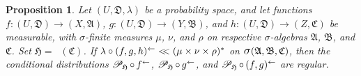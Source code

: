 \documentclass[
twoside=true,
paper=letter,
fontsize=9pt,
pagesize=auto,
leqno,
openany,
headsepline,
overfullrule,
]{scrbook}
\theoremstyle{plain}
\theoremstyle{plain}
\newtheorem{prop}[thm]{Proposition}
\theoremstyle{definition}
\theoremstyle{bfnoteitalic}
\theoremstyle{bfnoteroman}
\newcommand{\sigalg}[1]{\mathfrak{#1}}
\newcommand{\cali}[1]{\mathscr{#1}}
\newcommand{\condprobop}[1]{\mathop{\cali{P}\hspace{-1pt}}\nolimits_{#1}}
\newcommand{\sagb}{\mathop{\hbox{\large{$\sigma$}}}\nolimits}
\newcommand{\textsigma}{\hbox{\large{$\sigma$}}\kern-1pt}
\newcommand{\preimage}[1]{\mathop{#1^{\leftarrow}}}
\newcommand{\sigmaalgebra}{\sigalg{A}}
\newcommand{\sigmaalgebraii}{\sigalg{B}}
\newcommand{\sigmaalgebraiii}{\sigalg{C}}
\newcommand{\productsig}[2]{\sagb(#1,#2)}
\newcommand{\funcf}{f}
\newcommand{\funcg}{g}
\newcommand{\funch}{h}
\newcommand{\function}{f}
\newcommand{\functionii}{g}
\newcommand{\functioniii}{h}
\newcommand{\measurespace}{X}
\newcommand{\measurespaceii}{Y}
\newcommand{\measurespaceiii}{Z}
\newcommand{\abscont}{\mathrel{< \kern-3.5pt <}}
\newcommand{\measure}{\mu}
\newcommand{\measureii}{\nu}
\newcommand{\measureiii}{\lambda}
\newcommand{\measlambda}{\lambda}
\newcommand{\measureiv}{\rho}
\newcommand{\uspace}{U}%
\newcommand{\uspacesig}{\sigalg{D}}
\begin{document}
\begin{prop}\label{abs_cont_reg}
Let
$(\uspace,\uspacesig,\measlambda)$
be a probability space, and let functions
$\function:(\uspace,\uspacesig)\to (\measurespace,\sigmaalgebra)$,
$\functionii:(\uspace,\uspacesig)\to (\measurespaceii,\sigmaalgebraii)$,
and
$\functioniii:(\uspace,\uspacesig)\to (\measurespaceiii,\sigmaalgebraiii)$
be measurable, with \textsigma-finite  measures
$\measure$, $\measureii$, and $\measureiv$ on respective \textsigma-algebras
$\sigmaalgebra$, $\sigmaalgebraii$, and $\sigmaalgebraiii$.
Set $\sigalg{H}=\preimage{\funch}(\sigmaalgebraiii)$.
If
$\measureiii\circ\preimage{(\function,\functionii,\functioniii)}
\abscont
(\measure\times\measureii\times\measureiv)^*$ on
$\productsig{\sigmaalgebra}{\sigmaalgebraii,\sigmaalgebraiii}$,
then the conditional distributions
$\condprobop{\sigalg{H}}\circ \preimage{\funcf}$,
$\condprobop{\sigalg{H}}\circ \preimage{\funcg}$,
and
$\condprobop{\sigalg{H}} \circ \preimage{(\funcf,\funcg)}$
are regular.
\end{prop}
\end{document}
